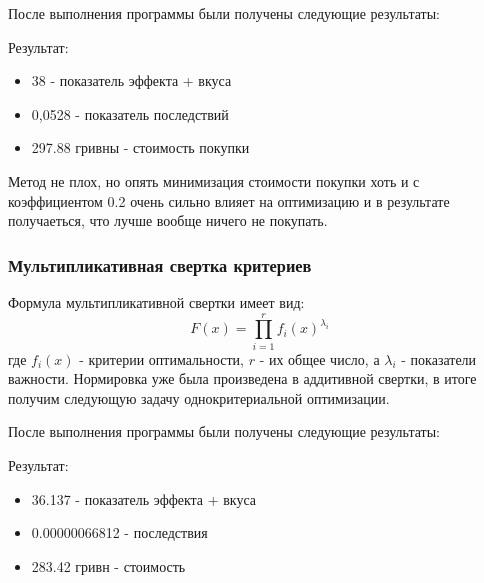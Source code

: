 \documentclass[14pt,a4paper,report]{report}
\begin{document}


После выполнения программы были получены следующие результаты:



Результат:
\begin{itemize}
\item 38 - показатель эффекта + вкуса
\item 0,0528 - показатель последствий
\item 297.88 гривны - стоимость покупки
\end{itemize}

Метод не плох, но опять минимизация стоимости покупки хоть и с коэффициентом 0.2 очень сильно влияет на оптимизацию и в результате получаеться, что лучше вообще ничего не покупать.

























\subsubsection{Мультипликативная свертка критериев}
Формула мультипликативной свертки имеет вид:
\begin{equation}
F(x) = \prod_{i=1}^{r}f_i(x)^{\lambda_i}
\end{equation}
где $f_i(x)$ - критерии оптимальности, $r$ - их общее число, а $\lambda_i$ - показатели важности. Нормировка уже была произведена в аддитивной свертки, в итоге получим следующую задачу однокритериальной оптимизации.




После выполнения программы были получены следующие результаты:



Результат:
\begin{itemize}
\item 36.137 - показатель эффекта + вкуса
\item 0.00000066812 - последствия
\item 283.42 гривн - стоимость 
\end{itemize}
\end{document}
